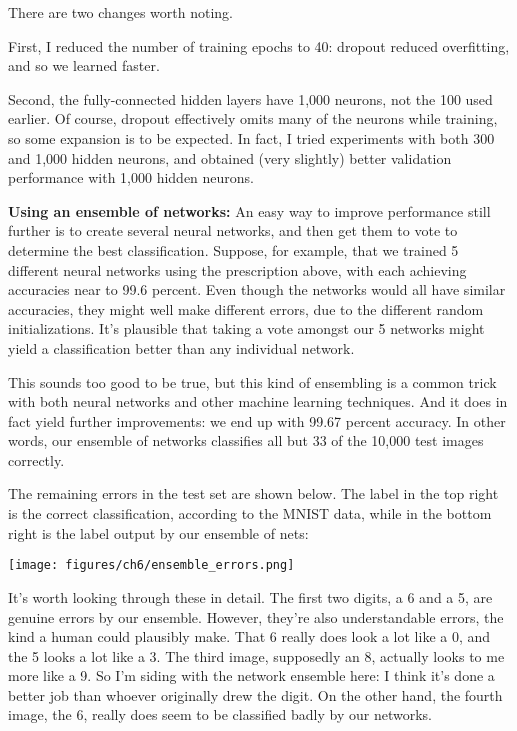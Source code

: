 \documentclass[a4paper,twoside,10pt]{book}
\begin{document}
There are two changes worth noting.

First, I reduced the number of training epochs to 40: dropout reduced overfitting, and so we learned faster.

Second, the fully-connected hidden layers have 1,000 neurons, not the 100 used earlier. Of course, dropout effectively omits many of the neurons while training, so some expansion is to be expected. In fact, I tried experiments with both 300 and 1,000 hidden neurons, and obtained (very slightly) better validation performance with 1,000 hidden neurons.

\textbf{Using an ensemble of networks:} An easy way to improve performance still further is to create several neural networks, and then get them to vote to determine the best classification. Suppose, for example, that we trained 5 different neural networks using the prescription above, with each achieving accuracies near to 99.6 percent. Even though the networks would all have similar accuracies, they might well make different errors, due to the different random initializations. It's plausible that taking a vote amongst our 5 networks might yield a classification better than any individual network.

This sounds too good to be true, but this kind of ensembling is a common trick with both neural networks and other machine learning techniques. And it does in fact yield further improvements: we end up with 99.67 percent accuracy. In other words, our ensemble of networks classifies all but 33 of the 10,000 test images correctly.

The remaining errors in the test set are shown below. The label in the top right is the correct classification, according to the MNIST data, while in the bottom right is the label output by our ensemble of nets:
\begin{center}
	\texttt{[image: figures/ch6/ensemble\_errors.png]}
\end{center}
It's worth looking through these in detail. The first two digits, a 6 and a 5, are genuine errors by our ensemble. However, they're also understandable errors, the kind a human could plausibly make. That 6 really does look a lot like a 0, and the 5 looks a lot like a 3. The third image, supposedly an 8, actually looks to me more like a 9. So I'm siding with the network ensemble here: I think it's done a better job than whoever originally drew the digit. On the other hand, the fourth image, the 6, really does seem to be classified badly by our networks.
\end{document}
